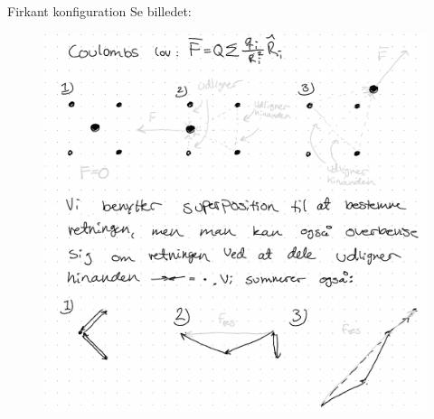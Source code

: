 \documentclass[crop=false, class=memoir]{standalone}
\begin{document}
\begin{opgave}{Firkant konfiguration}
Se billedet:
\begin{figure}
    \centering
    \includegraphics[width=\textwidth]{Elektro/Elekfig/elektro_opg4,3.png}
    \caption{}
    \label{fig:my_label}
\end{figure}


\end{opgave}
\end{document}
